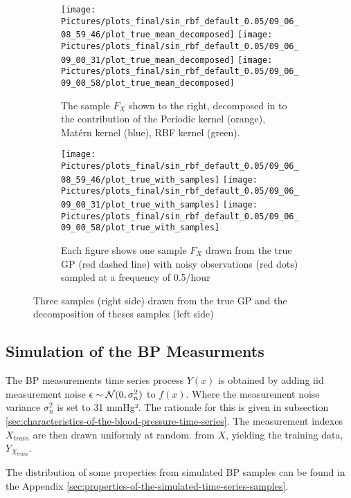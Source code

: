\begin{figure}[!ht]
\centering
\begin{subfigure}{.45\textwidth}
    \centering
    \texttt{[image: Pictures/plots\_final/sin\_rbf\_default\_0.05/09\_06\_08\_59\_46/plot\_true\_mean\_decomposed]}
    \texttt{[image: Pictures/plots\_final/sin\_rbf\_default\_0.05/09\_06\_09\_00\_31/plot\_true\_mean\_decomposed]}
    \texttt{[image: Pictures/plots\_final/sin\_rbf\_default\_0.05/09\_06\_09\_00\_58/plot\_true\_mean\_decomposed]}
  \caption{The sample $F_X$ shown to the right, decomposed in to the contribution of the Periodic kernel (orange),
      Matérn kernel (blue), RBF kernel (green).}
  \label{fig:true_mean_decomposed}
\end{subfigure}\hfill
\begin{subfigure}{.45\textwidth}
    \centering
    \texttt{[image: Pictures/plots\_final/sin\_rbf\_default\_0.05/09\_06\_08\_59\_46/plot\_true\_with\_samples]}
    \texttt{[image: Pictures/plots\_final/sin\_rbf\_default\_0.05/09\_06\_09\_00\_31/plot\_true\_with\_samples]}
    \texttt{[image: Pictures/plots\_final/sin\_rbf\_default\_0.05/09\_06\_09\_00\_58/plot\_true\_with\_samples]}
  \caption{Each figure shows one sample $F_X$ drawn from the true GP (red dashed line) with noisy observations
      (red dots) sampled at a frequency of 0.5/hour}
  \label{fig:sub2}
\end{subfigure}
\caption{Three samples (right side) drawn from the true GP and the decomposition of theses samples (left side)}
\label{fig:true_gp_samples}
\end{figure}


\subsection{Simulation of the BP Measurments}

The BP measurements time series process $Y(x)$ is obtained by adding iid measurement noise
$\epsilon \sim \operatorname{\mathcal{N}}(0, \sigma_n^2)$ to $f(x)$.
Where the measurement noise variance $\sigma_n^2$ is set to 31 mmHg².
The rationale for this is given in subsection
\ref{sec:characteristics-of-the-blood-pressure-time-series}.
The measurement indexes $X_{train}$ are then drawn uniformly at random.
from $X$, yielding the training data, $Y_{X_{train}}$.

The distribution of some properties from simulated BP samples can be found in the
Appendix \ref{sec:properties-of-the-simulated-time-series-samples}.


